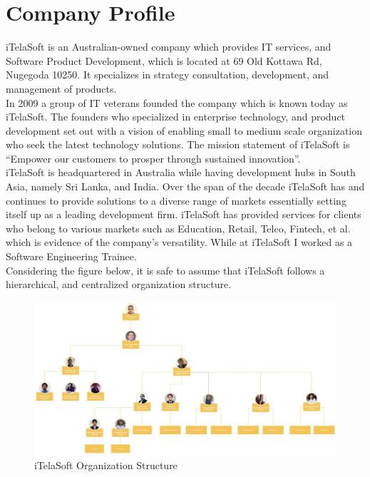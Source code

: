 \documentclass[12pt]{article}
\begin{document}
\section{Company Profile}
iTelaSoft is an Australian-owned company which provides IT services, and Software Product Development,
which is located at 69 Old Kottawa Rd, Nugegoda 10250. It 
specializes in strategy consultation, development, and management of products.\\
\newline
In 2009 a group of IT veterans founded the company which is known
today as iTelaSoft. The founders who specialized in
enterprise technology, and product development set out with a vision of enabling
small to medium scale organization who seek the latest technology solutions. The mission statement of
iTelaSoft is ``Empower our customers to prosper through sustained innovation''.\\
\newline
iTelaSoft is headquartered in Australia while having development hubs in South Asia, namely Sri Lanka, and India.
Over the span of the decade iTelaSoft has and continues to provide 
solutions to a diverse range of markets essentially setting itself
up as a leading development firm. iTelaSoft has provided services for clients who belong to various markets
such as Education, Retail, Telco, Fintech, et al. which is evidence of the company's versatility.
While at iTelaSoft I worked as a Software Engineering Trainee.\\
\newline
Considering the figure below, it is safe to assume that iTelaSoft follows a hierarchical, and centralized organization 
structure.\\
\newpage

\begin{figure}
  \includegraphics[width=\linewidth]{its_org_structure.jpg}
  \caption{iTelaSoft Organization Structure}
  \label{fig:org_structure}
\end{figure}
\newpage
\end{document}
